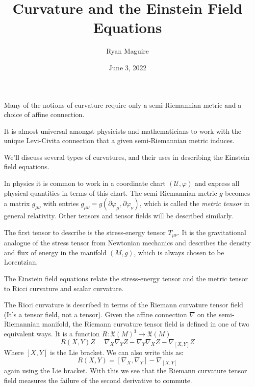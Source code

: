 \documentclass{beamer}
\title{Curvature and the Einstein Field Equations}
\author{Ryan Maguire}
\date{June 3, 2022}
\begin{document}
    \maketitle
    \begin{frame}
        Many of the notions of curvature require only a semi-Riemannian metric
        and a choice of affine connection.
        \par\hfill\par
        It is almost universal amongst physicists and mathematicians to work
        with the unique Levi-Civita connection that a given semi-Riemannian
        metric induces.
        \par\hfill\par
        We'll discuss several types of curvatures, and their uses in
        describing the Einstein field equations.
    \end{frame}
    \begin{frame}
        In physics it is common to work in a coordinate chart
        $(\mathcal{U},\varphi)$ and express all physical quantities in terms of
        this chart. The semi-Riemannian metric $g$ becomes a matrix
        $g_{\mu\nu}$ with entries
        $g_{\mu\nu}=g(\partial\varphi_{\mu},\partial\varphi_{\nu})$, which is
        called the \textit{metric tensor} in general relativity. Other tensors
        and tensor fields will be described similarly.
    \end{frame}
    \begin{frame}
        The first tensor to describe is the stress-energy tensor $T_{\mu\nu}$.
        It is the gravitational analogue of the stress tensor from Newtonian
        mechanics and describes the density and flux of energy in the
        manifold $(M,g)$, which is always chosen to be Lorentzian.
        \par\hfill\par
        The Einstein field equations relate the stress-energy tensor and the
        metric tensor to Ricci curvature and scalar curvature.
    \end{frame}
    \begin{frame}
        The Ricci curvature is described in terms of the Riemann curvature
        tensor field (It's a tensor field, not a tensor). Given the affine
        connection $\nabla$ on the semi-Riemannian manifold, the Riemann
        curvature tensor field is defined in one of two equivalent ways.
        It is a function $R:\mathfrak{X}(M)^{3}\rightarrow\mathfrak{X}(M)$
        \begin{equation}
            R(X,Y)Z=
                \nabla_{X}\nabla_{Y}Z-\nabla_{Y}\nabla_{X}Z-\nabla_{[X,Y]}Z
        \end{equation}
        Where $[X,Y]$ is the Lie bracket. We can also write this as:
        \begin{equation}
            R(X,Y)=[\nabla_{X},\nabla_{Y}]-\nabla_{[X,Y]}
        \end{equation}
        again using the Lie bracket. With this we see that the Riemann
        curvature tensor field measures the failure of the second derivative to
        commute.
    \end{frame}
\end{document}
